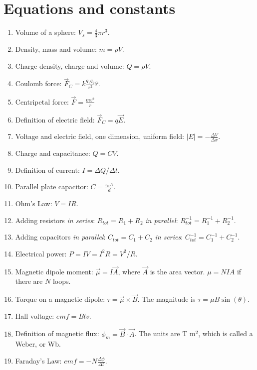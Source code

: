 \documentclass[10pt]{article}
\begin{document}
\maketitle

\section{Equations and constants}

\begin{enumerate}
\item Volume of a sphere: $V_s = \frac{4}{3}\pi r^3$.
\item Density, mass and volume: $m = \rho V$.
\item Charge density, charge and volume: $Q = \rho V$.
\item Coulomb force: $\vec{F}_C = k \frac{q_1 q_2}{r^2}\hat{r}$.
\item Centripetal force: $\vec{F} = \frac{mv^2}{r}$
\item Definition of electric field: $\vec{F}_C = q\vec{E}$.
\item Voltage and electric field, one dimension, uniform field: $|E| = - \frac{\Delta V}{\Delta x}$.
\item Charge and capacitance: $Q = CV$.
\item Definition of current: $I = \Delta Q / \Delta t$.
\item Parallel plate capacitor: $C = \frac{\epsilon_0 A}{d}$.
\item Ohm's Law: $V = IR$.
\item Adding resistors \textit{in series}: $R_{tot} = R_1 + R_2$ \textit{in parallel}: $R_{tot}^{-1} = R_1^{-1} + R_2^{-1}$.
\item Adding capacitors \textit{in parallel}: $C_{tot} = C_1 + C_2$ \textit{in series}: $C_{tot}^{-1} = C_1^{-1} + C_2^{-1}$.
\item Electrical power: $P = IV = I^2 R = V^2/R$.
\item Magnetic dipole moment: $\vec{\mu} = I \vec{A}$, where $\vec{A}$ is the area vector. $\mu = N I A$ if there are $N$ loops.
\item Torque on a magnetic dipole: $\tau = \vec{\mu} \times \vec{B}$.  The magnitude is $\tau = \mu B \sin(\theta)$.
\item Hall voltage: $emf = B l v$.
\item Definition of magnetic flux: $\phi_m = \vec{B} \cdot \vec{A}$.  The units are T m$^2$, which is called a Weber, or Wb.
\item Faraday's Law: $emf = -N \frac{\Delta \phi}{\Delta t}$.

\end{enumerate}
\end{document}
